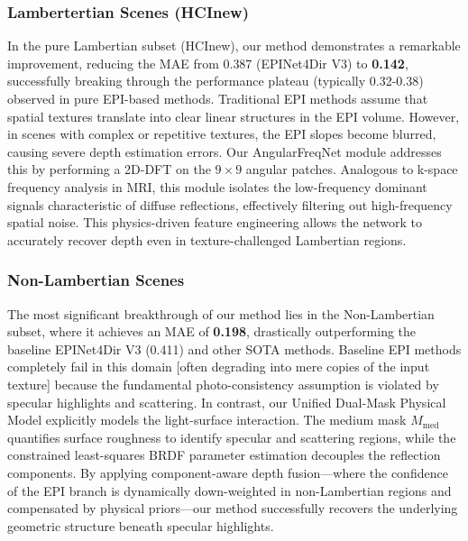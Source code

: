 \subsubsection{Lambertertian Scenes (HCInew)}
In the pure Lambertian subset (HCInew), our method demonstrates a remarkable improvement, reducing the MAE from 0.387 (EPINet4Dir V3) to \textbf{0.142}, successfully breaking through the performance plateau (typically 0.32-0.38) observed in pure EPI-based methods. Traditional EPI methods assume that spatial textures translate into clear linear structures in the EPI volume. However, in scenes with complex or repetitive textures, the EPI slopes become blurred, causing severe depth estimation errors. Our AngularFreqNet module addresses this by performing a 2D-DFT on the $9 \times 9$ angular patches. Analogous to k-space frequency analysis in MRI, this module isolates the low-frequency dominant signals characteristic of diffuse reflections, effectively filtering out high-frequency spatial noise. This physics-driven feature engineering allows the network to accurately recover depth even in texture-challenged Lambertian regions.

\subsubsection{Non-Lambertian Scenes}
The most significant breakthrough of our method lies in the Non-Lambertian subset, where it achieves an MAE of \textbf{0.198}, drastically outperforming the baseline EPINet4Dir V3 (0.411) and other SOTA methods. Baseline EPI methods completely fail in this domain  [often degrading into mere copies of the input texture] because the fundamental photo-consistency assumption is violated by specular highlights and scattering. In contrast, our Unified Dual-Mask Physical Model explicitly models the light-surface interaction. The medium mask $M_{\text{med}}$ quantifies surface roughness to identify specular and scattering regions, while the constrained least-squares BRDF parameter estimation decouples the reflection components. By applying component-aware depth fusion—where the confidence of the EPI branch is dynamically down-weighted in non-Lambertian regions and compensated by physical priors—our method successfully recovers the underlying geometric structure beneath specular highlights.

